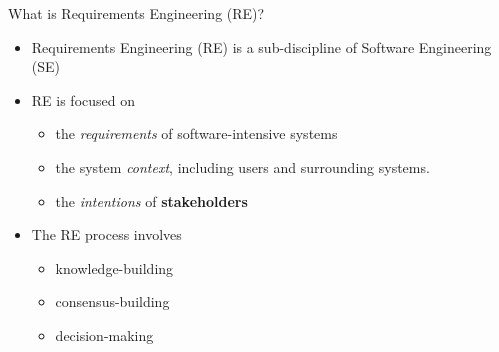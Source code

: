 
\begin{Slide}{What is Requirements Engineering (RE)?}

\begin{itemize}
\item Requirements Engineering (RE) is a sub-discipline of Software Engineering (SE) 

\item RE is focused on 

\begin{itemize}
\item the \textit{requirements} of software-intensive systems 
\item the system \textit{context}, including users and surrounding systems.
\item the \textit{intentions} of \textbf{stakeholders}

\end{itemize}
\item The RE process involves 
\begin{itemize}
\item knowledge-building
\item consensus-building
\item decision-making
\end{itemize}
\end{itemize}
\end{Slide}